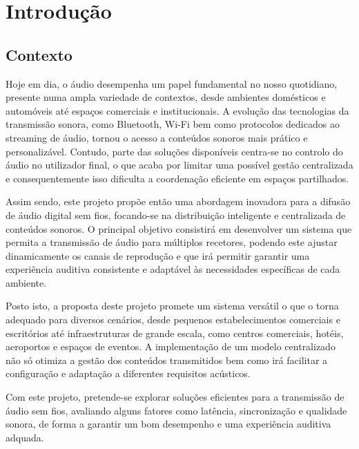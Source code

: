 \documentclass{article}
\begin{document}
\newpage

\section{Introdução}

\vspace{1cm}


\subsection{Contexto}

\vspace{0.1cm}

Hoje em dia, o áudio desempenha um papel fundamental no nosso quotidiano, presente numa ampla variedade de contextos, desde ambientes domésticos e automóveis até espaços comerciais e institucionais. A evolução das tecnologias da transmissão sonora, como Bluetooth, Wi-Fi bem como  protocolos dedicados ao streaming de áudio, tornou o acesso a conteúdos sonoros mais prático e personalizável. Contudo, parte das soluções disponíveis centra-se no controlo do áudio no utilizador final, o que acaba por limitar uma possível gestão centralizada e consequentemente isso dificulta a coordenação eficiente em espaços partilhados.

Assim sendo, este projeto propõe então uma abordagem inovadora para a difusão de áudio digital sem fios, focando-se na distribuição inteligente e centralizada de conteúdos sonoros. O principal objetivo consistirá em desenvolver um sistema que permita a transmissão de áudio para múltiplos recetores, podendo este ajustar dinamicamente os canais de reprodução e que irá permitir garantir uma experiência auditiva consistente e adaptável às necessidades específicas de cada ambiente.

Posto isto, a proposta deste projeto promete um sistema versátil o que o torna adequado para diversos cenários, desde pequenos estabelecimentos comerciais e escritórios até infraestruturas de grande escala, como centros comerciais, hotéis, aeroportos e espaços de eventos. A implementação de um modelo centralizado não só otimiza a gestão dos conteúdos transmitidos bem como irá  facilitar a configuração e adaptação a diferentes requisitos acústicos.

Com este projeto, pretende-se explorar soluções eficientes para a transmissão de áudio sem fios, avaliando alguns fatores como latência, sincronização e qualidade sonora, de forma a garantir um bom desempenho e uma experiência auditiva adquada.
\end{document}
